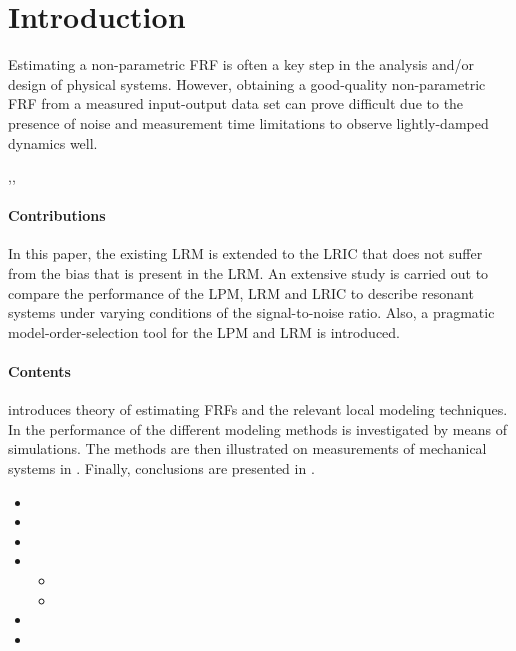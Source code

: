 \section{Introduction}
Estimating a non-parametric \gls{FRF} is often a key step in the analysis and/or design of physical systems.
However, obtaining a good-quality non-parametric \gls{FRF} from a measured input-output data set can prove difficult due to the presence of noise and measurement time limitations to observe lightly-damped dynamics well.


\citep{Pintelon2010LPM1},\citep{Pintelon2010LPM2},\citep{McKelvey2012LRM}


\paragraph*{Contributions}
In this paper, the existing \gls{LRM} is extended to the \gls{LRIC} that does not suffer from  the bias that is present in the \gls{LRM}.
An extensive study is carried out to compare the performance of the \gls{LPM}, \gls{LRM} and \gls{LRIC} to describe resonant systems under varying conditions of the signal-to-noise ratio.
Also, a pragmatic model-order-selection tool for the \gls{LPM} and \gls{LRM} is introduced.

\paragraph*{Contents}
 introduces theory of estimating \glspl{FRF} and the relevant local modeling techniques.
In  the performance of the different modeling methods is investigated by means of simulations.
The methods are then illustrated on measurements of mechanical systems in .
Finally, conclusions are presented in .


\begin{itemize}
    \item {}
    \item {}
    \item {}
    \item {}
      \begin{itemize}
        \item {}
        \item {}
      \end{itemize}
    \item {}
    \item {}
\end{itemize}

